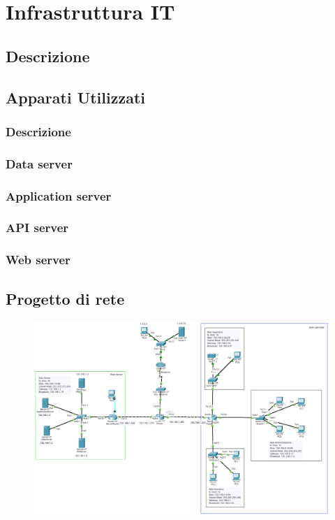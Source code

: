 \section{Infrastruttura IT}
\subsection{Descrizione}
\subsection{Apparati Utilizzati}
\subsubsection{Descrizione}
\subsubsection{Data server}
\subsubsection{Application server}
\subsubsection{API server}
\subsubsection{Web server}
\clearpage
\subsection{Progetto di rete}
\begin{figure}
    \includegraphics[scale=.5]{images/rete.png}
\end{figure}
\clearpage